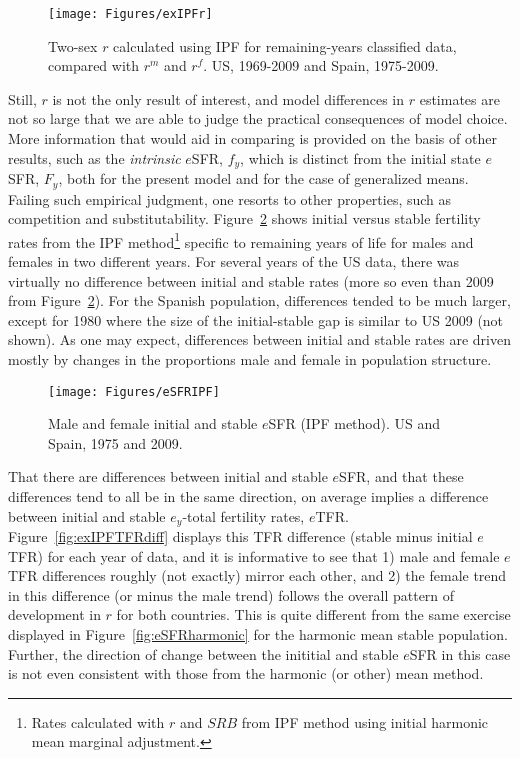  \begin{figure}[ht!]
        \centering  
          \caption{Two-sex $r$ calculated using IPF for remaining-years
          classified data, compared with $r^m$ and $r^f$. US, 1969-2009 and
          Spain, 1975-2009.}
           \texttt{[image: Figures/exIPFr]}
          \label{fig:exIPFr}
\end{figure}

Still, $r$ is not the only result of interest, and model differences in $r$
estimates are not so large that we are able to judge the practical consequences
of model choice. More information that would aid in comparing is provided on the
basis of other results, such as the \textit{intrinsic} $e$SFR, $f_y$, which is
distinct from the initial state $e$SFR, $F_y$, both for the present model and
for the case of generalized means. Failing such empirical judgment, one resorts
to other properties, such as competition and substitutability.
Figure~\ref{fig:eSFRIPF} shows initial versus stable fertility rates from the 
IPF method\footnote{Rates calculated with $r$
and $SRB$ from IPF method using initial harmonic mean marginal adjustment.}
specific to remaining years of life for males and females in two different years. 
For several years of the US data, there was virtually no difference between initial 
and stable rates (more so even than 2009 from Figure~\ref{fig:eSFRIPF}). For
the Spanish population, differences tended to be much larger, except for 1980
where the size of the initial-stable gap is similar to US 2009 (not shown). As
one may expect, differences between initial and stable rates are driven mostly 
by changes in the proportions male and female in population structure. 

\begin{figure}[ht!]
        \centering  
          \caption{Male and female initial and stable $e$SFR (IPF method). US
          and Spain, 1975 and 2009.}
           \texttt{[image: Figures/eSFRIPF]}
          \label{fig:eSFRIPF}
\end{figure}

That there are differences between initial and stable $e$SFR, and that these
differences tend to all be in the same direction, on average implies a
difference between initial and stable $e_y$-total fertility rates, $e$TFR. Figure~\ref{fig:exIPFTFRdiff} displays this TFR difference (stable minus
initial $e$TFR) for each year of data, and it is informative to see that 1)
male and female $e$TFR differences roughly (not exactly) mirror each other, and
2) the female trend in this difference (or minus the male trend) follows the
overall pattern of development in $r$ for both countries. This is quite
different from the same exercise displayed in Figure~\ref{fig:eSFRharmonic} for
the harmonic mean stable population. Further, the direction of change between
the inititial and stable $e$SFR in this case is not even consistent with those
from the harmonic (or other) mean method.

